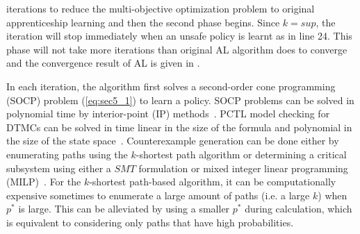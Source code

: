 \noindent iterations to reduce the multi-objective optimization problem to original apprenticeship learning and then the second phase begins. Since $k=sup$, the iteration will stop immediately when an unsafe policy is learnt as in line 24. This phase will not take more iterations than original AL algorithm does to converge and the convergence result of AL is given in \cite{Abbeel:2004:ALV:1015330.1015430}. 

In each iteration, the algorithm first solves a second-order cone programming (SOCP) problem (\ref{eq:sec5_1}) to learn a policy. SOCP problems can be solved in polynomial time by interior-point (IP) methods~\cite{Kuo:2004aa}.
PCTL model checking for DTMCs can be solved in time linear in the size of the formula and polynomial in the size of the state space~\cite{Hansson1994}. 
Counterexample generation can be done either by enumerating paths using the $k$-shortest path algorithm or determining a critical subsystem using either a $SMT$ formulation or mixed integer linear programming (MILP)~\cite{Wimmer2012}. For the $k$-shortest path-based algorithm, it can be computationally expensive sometimes to enumerate a large amount of paths (i.e. a large $k$) when $p^*$ is large. This can be alleviated by using a smaller $p^*$ during calculation, which is equivalent to considering only paths that have high probabilities.
